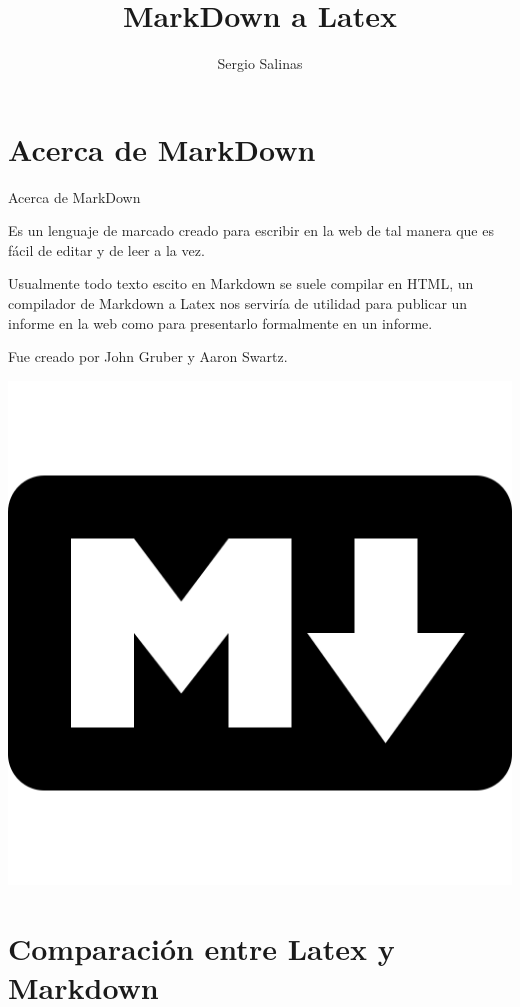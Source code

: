 \documentclass[11pt]{beamer}
\author{Sergio Salinas}
\title{MarkDown a Latex}
\institute{Universidad Santiago de Chile}
\begin{document}
\begin{frame}
\titlepage
\end{frame}

\begin{frame}
\tableofcontents
\end{frame}

\section{Acerca de MarkDown}

\begin{frame}{Acerca de MarkDown}

Es un lenguaje de marcado creado para escribir en la web de tal manera que es fácil de editar y de leer a la vez.

Usualmente todo texto escito en Markdown se suele compilar en HTML, un compilador de Markdown a Latex nos serviría de utilidad para publicar un informe en la web como para presentarlo formalmente en un informe.

Fue creado por John Gruber y  Aaron Swartz.
\begin{center}
\includegraphics[scale=0.2]{imagenes/markdown-512.png} 
\end{center}
\end{frame}

\section{Comparación entre Latex y Markdown}
\end{document}
